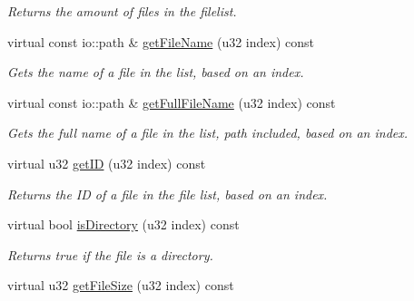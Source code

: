\begin{DoxyCompactItemize}
\begin{DoxyCompactList}\small\item\em Returns the amount of files in the filelist. \end{DoxyCompactList}\item 
\hypertarget{classirr_1_1io_1_1_c_file_list_a65ac4be491bd0601246b0b34f698bfd2}{virtual const io\-::path \& \hyperlink{classirr_1_1io_1_1_c_file_list_a65ac4be491bd0601246b0b34f698bfd2}{get\-File\-Name} (u32 index) const }\label{classirr_1_1io_1_1_c_file_list_a65ac4be491bd0601246b0b34f698bfd2}

\begin{DoxyCompactList}\small\item\em Gets the name of a file in the list, based on an index. \end{DoxyCompactList}\item 
\hypertarget{classirr_1_1io_1_1_c_file_list_aaf4de4d5112c976f573bdf74958de7e3}{virtual const io\-::path \& \hyperlink{classirr_1_1io_1_1_c_file_list_aaf4de4d5112c976f573bdf74958de7e3}{get\-Full\-File\-Name} (u32 index) const }\label{classirr_1_1io_1_1_c_file_list_aaf4de4d5112c976f573bdf74958de7e3}

\begin{DoxyCompactList}\small\item\em Gets the full name of a file in the list, path included, based on an index. \end{DoxyCompactList}\item 
\hypertarget{classirr_1_1io_1_1_c_file_list_a153faf211ccc289337aa39d2dadcd2cf}{virtual u32 \hyperlink{classirr_1_1io_1_1_c_file_list_a153faf211ccc289337aa39d2dadcd2cf}{get\-I\-D} (u32 index) const }\label{classirr_1_1io_1_1_c_file_list_a153faf211ccc289337aa39d2dadcd2cf}

\begin{DoxyCompactList}\small\item\em Returns the I\-D of a file in the file list, based on an index. \end{DoxyCompactList}\item 
\hypertarget{classirr_1_1io_1_1_c_file_list_a3645565326ce02e92020ef49de271df6}{virtual bool \hyperlink{classirr_1_1io_1_1_c_file_list_a3645565326ce02e92020ef49de271df6}{is\-Directory} (u32 index) const }\label{classirr_1_1io_1_1_c_file_list_a3645565326ce02e92020ef49de271df6}

\begin{DoxyCompactList}\small\item\em Returns true if the file is a directory. \end{DoxyCompactList}\item 
\hypertarget{classirr_1_1io_1_1_c_file_list_a9c4c616dbf3b5fed978cdd1aa48b1a2f}{virtual u32 \hyperlink{classirr_1_1io_1_1_c_file_list_a9c4c616dbf3b5fed978cdd1aa48b1a2f}{get\-File\-Size} (u32 index) const }\label{classirr_1_1io_1_1_c_file_list_a9c4c616dbf3b5fed978cdd1aa48b1a2f}


\end{DoxyCompactItemize}

